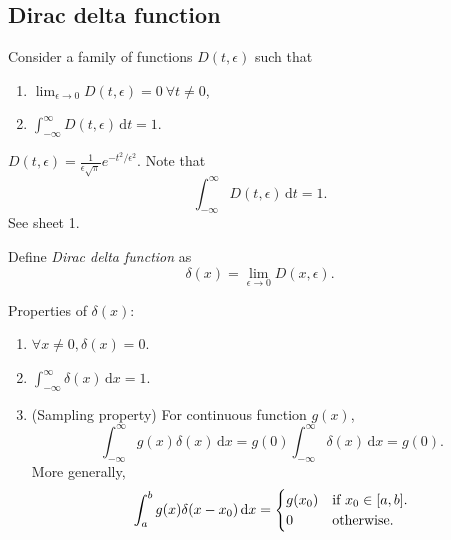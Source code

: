 \documentclass[10pt]{article}
\begin{document}
      \subsection{Dirac delta function}
      Consider a family of functions $ D(t,\epsilon) $ such that 
      \begin{enumerate}
          \item $ \lim_{\epsilon \to 0} D(t,\epsilon)=0\  \forall t\neq 0 $,
          \item $\displaystyle \int_{-\infty}^{\infty} D(t,\epsilon) \,\mathrm{d}t =1$.
      \end{enumerate}
      \begin{example}
          $\displaystyle D(t,\epsilon)=\frac{1}{\epsilon\sqrt{\pi}}e^{-t^2/\epsilon^2} $. Note that
          \[
              \int_{-\infty}^{\infty} D(t,\epsilon) \,\mathrm{d}t=1
          .\]
          See sheet 1.
          \begin{center}
          \end{center}
      \end{example}
      \begin{definition}
        Define \textit{Dirac delta function} as 
        \[
            \delta(x)=\lim_{\epsilon \to 0} D(x,\epsilon)
        .\]
      \end{definition}
      Properties of $ \delta(x) $:
      \begin{enumerate}
          \item $ \forall x\neq 0, \delta(x)=0 $.
          \item $\displaystyle \int_{-\infty }^{\infty } \delta(x) \,\mathrm{d}x=1$.
          \item (Sampling property) For continuous function $g(x)$, 
          \[
              \int_{-\infty}^{\infty} g(x)\delta(x) \,\mathrm{d}x = g(0)\int_{-\infty}^{\infty}  \delta(x)\,\mathrm{d}x = g(0)
          .\]
          More generally,
          \begin{equation}\label{eq:generalised sampling property}
            \int_{a}^{b} g(x)\delta(x-x_0) \,\mathrm{d}x = \begin{cases}
                g(x_0) &\text{if $ x_0\in [a,b] $.}\\
                0 &\text{otherwise.}\\
                \end{cases} 
          \end{equation}
      \end{enumerate}
\end{document}
